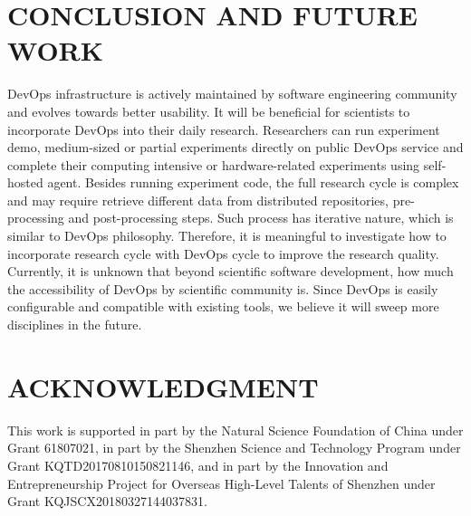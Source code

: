 \documentclass[10pt, conference, compsocconf]{IEEEtran}
\begin{document}
\section{CONCLUSION AND FUTURE WORK}
DevOps infrastructure is actively maintained by software engineering community and evolves towards better usability. It will be beneficial for scientists to incorporate DevOps into their daily research. Researchers can run experiment demo, medium-sized or partial experiments directly on public DevOps service and complete their computing intensive or hardware-related experiments using self-hosted agent. Besides running experiment code, the full research cycle is complex and may require retrieve different data from distributed repositories, pre-processing and post-processing steps. Such process has iterative nature, which is similar to DevOps philosophy. Therefore, it is meaningful to investigate how to incorporate research cycle with DevOps cycle to improve the research quality. Currently, it is unknown that beyond scientific software development, how much the accessibility of DevOps by scientific community is. Since DevOps is easily configurable and compatible with existing tools, we believe it will sweep more disciplines in the future.

\section{ACKNOWLEDGMENT}

This work is supported in part by the Natural Science Foundation of China under Grant 61807021, in part by the Shenzhen Science and Technology Program under Grant KQTD20170810150821146, and in part by the Innovation and Entrepreneurship Project for Overseas High-Level Talents of Shenzhen under Grant KQJSCX20180327144037831.



\end{document}

